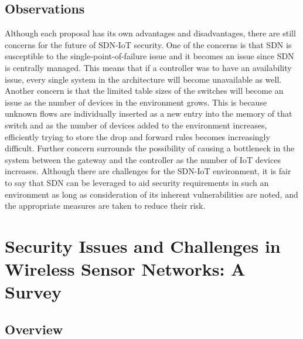 \subsection {Observations}
\smallskip

Although each proposal has its own advantages and disadvantages, there are still concerns for the future of SDN-IoT security. One of the concerns is that SDN is susceptible to the single-point-of-failure issue and it becomes an issue since SDN is centrally managed. This means that if a controller was to have an availability issue, every single system in the architecture will become unavailable as well. Another concern is that the limited table sizes of the switches will become an issue as the number of devices in the environment grows. This is because unknown flows are individually inserted as a new entry into the memory of that switch and as the number of devices added to the environment increases, efficiently trying to store the drop and forward rules becomes increasingly difficult. Further concern surrounds the possibility of causing a bottleneck in the system between the gateway and the controller as the number of IoT devices increases. Although there are challenges for the SDN-IoT environment, it is fair to say that SDN can be leveraged to aid security requirements in such an environment as long as consideration of its inherent vulnerabilities are noted, and the appropriate measures are taken to reduce their risk.

\section {Security Issues and Challenges in Wireless Sensor Networks: A Survey}
\subsection {Overview}

